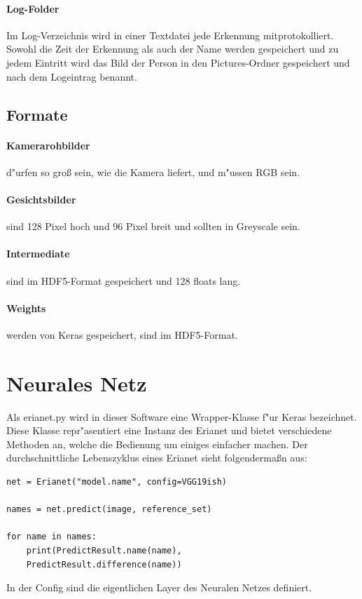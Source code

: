 \documentclass[12pt]{article}
\begin{document}
\paragraph{Log-Folder}
Im Log-Verzeichnis wird in einer Textdatei jede Erkennung mitprotokolliert.
Sowohl die Zeit der Erkennung als auch der Name werden gespeichert und zu
jedem Eintritt wird das Bild der Person in den Pictures-Ordner gespeichert
und nach dem Logeintrag benannt.
\subsection{Formate}
\paragraph{Kamerarohbilder}
d"urfen so gro{\ss} sein, wie die Kamera liefert, und m"ussen RGB sein.
\paragraph{Gesichtsbilder}
sind 128 Pixel hoch und 96 Pixel breit und sollten in Greyscale 
sein.
\paragraph{Intermediate}
sind im HDF5-Format gespeichert und 128 floats lang.
\paragraph{Weights}
werden von Keras gespeichert, sind im HDF5-Format. 

\pagebreak
\section{Neurales Netz}
Als erianet.py wird in dieser Software eine Wrapper-Klasse f"ur 
Keras bezeichnet. Diese Klasse repr"asentiert eine Instanz des 
Erianet und bietet verschiedene Methoden an, welche die 
Bedienung um einiges einfacher machen. Der durchschnittliche
Lebenszyklus eines Erianet sieht folgenderma{\ss}n aus:
\begin{lstlisting}[frame=single]
net = Erianet("model.name", config=VGG19ish)

names = net.predict(image, reference_set)

for name in names:
    print(PredictResult.name(name), 
    PredictResult.difference(name))
\end{lstlisting}
In der Config sind die eigentlichen Layer des Neuralen Netzes definiert.
\end{document}
